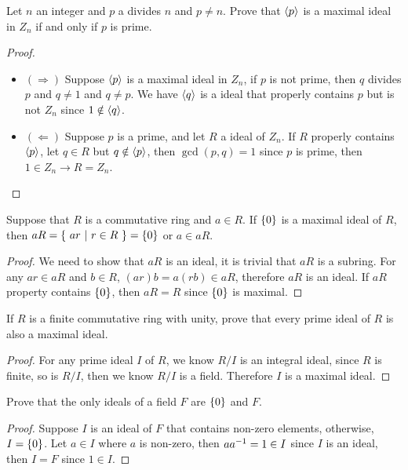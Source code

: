 \documentclass[../main.tex]{subfiles}
\begin{document}
\setcounter{exercise}{6}
\begin{exercise}
  Let $n$ an integer and $p$ a divides $n$ and $p \neq n$.
  Prove that $\langle p \rangle$ is a maximal ideal in $Z_n$ if and only if $p$ is prime.
\end{exercise}
\begin{proof}
  ~
  \begin{itemize}
    \item $(\Rightarrow)$ Suppose $\langle p \rangle$ is a maximal ideal in $Z_n$, if $p$
      is not prime, then $q$ divides $p$ and $q \neq 1$ and $q \neq p$.
      We have $\langle q \rangle$ is a ideal that properly contains $p$ but is not $Z_n$
      since $1 \notin \langle q \rangle$.
    \item $(\Leftarrow)$ Suppose $p$ is a prime, and let $R$ a ideal of $Z_n$.
      If $R$ properly contains $\langle p \rangle$, let $q \in R$ but $q \notin \langle p \rangle$,
      then $\gcd(p, q) = 1$ since $p$ is prime, then $1 \in Z_n \rightarrow R = Z_n$.
  \end{itemize}
\end{proof}

\setcounter{exercise}{8}
\begin{exercise}
  Suppose that $R$ is a commutative ring and $a \in R$.
  If $\{0\}$ is a maximal ideal of $R$, then $aR = \{ \ ar \ | \ r \in R \ \} = \{0\}$ or $a \in aR$.
\end{exercise}
\begin{proof}
  We need to show that $aR$ is an ideal, it is trivial that $aR$ is a subring.
  For any $ar \in aR$ and $b \in R$, $(ar)b = a(rb) \in aR$, therefore $aR$ is an ideal.
  If $aR$ property contains $\{0\}$, then $aR = R$ since $\{0\}$ is maximal.
\end{proof}

\setcounter{exercise}{21}
\begin{exercise}
  If $R$ is a finite commutative ring with unity, prove that every prime ideal of
  $R$ is also a maximal ideal.
\end{exercise}
\begin{proof}
  For any prime ideal $I$ of $R$, we know $R/I$ is an integral ideal,
  since $R$ is finite, so is $R/I$, then we know $R/I$ is a field.
  Therefore $I$ is a maximal ideal.
\end{proof}

\setcounter{exercise}{38}
\begin{exercise}
  Prove that the only ideals of a field $F$ are $\{0\}$ and $F$.
\end{exercise}
\begin{proof}
  Suppose $I$ is an ideal of $F$ that contains non-zero elements,
  otherwise, $I = \{0\}$.
  Let $a \in I$ where $a$ is non-zero, then $aa^{-1} = 1 \in I$
  since $I$ is an ideal, then $I = F$ since $1 \in I$.
\end{proof}
\end{document}
